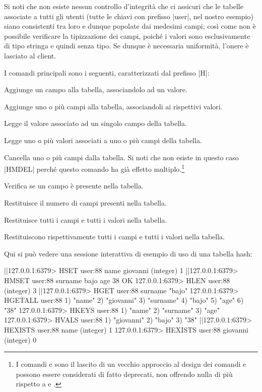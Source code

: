 Si noti che non esiste nessun controllo d'integrità che ci assicuri che le tabelle associate a tutti
gli utenti (tutte le chiavi con prefisso \cverb|user|, nel nostro esempio) siano consistenti tra loro
e dunque popolate dai medesimi campi; così come non è possibile verificare la tipizzazione dei
campi, poiché i valori sono esclusivamente di tipo stringa e quindi senza tipo. Se dunque è
necessaria uniformità, l'onere è lasciato al client.

I comandi principali sono i seguenti, caratterizzati dal prefisso \cverb|H|:

\begin{description}[style=nextline,font={\bfseries\ttfamily}]
	\item[HSET key field value] Aggiunge un campo alla tabella, associandolo ad un valore.
	\item[{HMSET key field value [field value\dots]}] Aggiunge uno o più campi alla tabella,
		associandoli ai rispettivi valori.
	\item[HGET key field] Legge il valore associato ad un singolo campo della tabella.
	\item[{HMGET key field [field\dots]}] Legge uno o più valori associati a uno o più campi della
		tabella.
	\item[{HDEL key field [field\dots]}] Cancella uno o più campi dalla tabella. Si noti che
		non esiste in questo caso \cverb|HMDEL| perché questo comando ha già effetto
		multiplo.\footnote{I comandi  e  sono il lascito di un vecchio
		approccio al design dei comandi e possono essere considerati di fatto deprecati, non
		offrendo nulla di più rispetto a  e .}
	\item[HEXISTS key field] Verifica se un campo è presente nella tabella.
	\item[HLEN key] Restituisce il numero di campi presenti nella tabella.
	\item[HGETALL key] Restituisce tutti i campi e tutti i valori nella tabella.
	\item[HKEYS key / HVALS key] Restituiscono rispettivamente tutti i campi e tutti i valori
		nella tabella.
\end{description}

Qui si può vedere una sessione interattiva di esempio di uso di una tabella hash:

\begin{commentedsource}[style=redis]
|\lnote|127.0.0.1:6379> HSET user:88 name giovanni
(integer) 1
|\lnote|127.0.0.1:6379> HMSET user:88 surname bajo age 38
OK
127.0.0.1:6379> HLEN user:88
(integer) 3
|\lnote|127.0.0.1:6379> HGET user:88 surname
"bajo"
127.0.0.1:6379> HGETALL user:88
1) "name"
2) "giovanni"
3) "surname"
4) "bajo"
5) "age"
6) "38"
127.0.0.1:6379> HKEYS user:88
1) "name"
2) "surname"
3) "age"
127.0.0.1:6379> HVALS user:88
1) "giovanni"
2) "bajo"
3) "38"
|\lnote|127.0.0.1:6379> HEXISTS user:88 name
(integer) 1
127.0.0.1:6379> HEXISTS user:88 giovanni
(integer) 0
\end{commentedsource}

